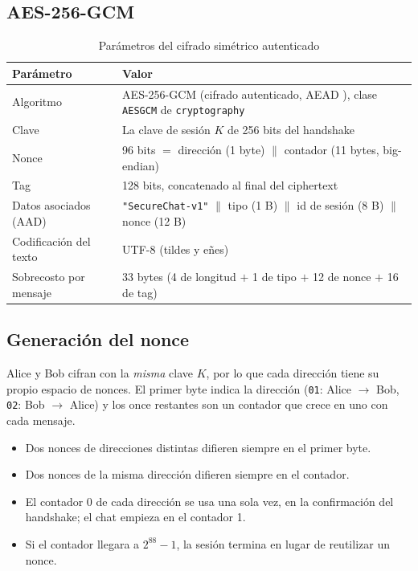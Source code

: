 \documentclass[11pt,a4paper]{article}
\theoremstyle{definition}
\theoremstyle{remark}
\newcommand{\code}[1]{\texttt{#1}}
\begin{document}
\subsection{AES-256-GCM}
\label{subsec:gcm}

\begin{table}[H]
  \centering
  \caption{Parámetros del cifrado simétrico autenticado}
  \label{tab:gcm}
  \small
  \begin{tabularx}{\linewidth}{@{}P{4.2cm} Y@{}}
    \toprule
    \textbf{Parámetro} & \textbf{Valor} \\
    \midrule
    Algoritmo           & AES-256-GCM (cifrado autenticado, AEAD \citep{rfc5116}), clase \code{AESGCM} de \code{cryptography} \\
    Clave               & La clave de sesión $K$ de 256 bits del handshake \\
    Nonce               & 96 bits $=$ dirección (1 byte) $\|$ contador (11 bytes, big-endian) \\
    Tag                 & 128 bits, concatenado al final del ciphertext \\
    Datos asociados (AAD) & \code{"SecureChat-v1"} $\|$ tipo (1 B) $\|$ id de sesión (8 B) $\|$ nonce (12 B) \\
    Codificación del texto & UTF-8 (tildes y eñes) \\
    Sobrecosto por mensaje & 33 bytes (4 de longitud $+$ 1 de tipo $+$ 12 de nonce $+$ 16 de tag) \\
    \bottomrule
  \end{tabularx}
\end{table}

\subsection{Generación del nonce}
\label{subsec:nonce}

Alice y Bob cifran con la \emph{misma} clave $K$, por lo que cada dirección
tiene su propio espacio de nonces. El primer byte indica la dirección
(\code{01}: Alice $\rightarrow$ Bob, \code{02}: Bob $\rightarrow$ Alice) y
los once restantes son un contador que crece en uno con cada mensaje.

\begin{itemize}
  \item Dos nonces de direcciones distintas difieren siempre en el primer byte.
  \item Dos nonces de la misma dirección difieren siempre en el contador.
  \item El contador 0 de cada dirección se usa una sola vez, en la
        confirmación del handshake; el chat empieza en el contador 1.
  \item Si el contador llegara a $2^{88}-1$, la sesión termina en lugar de
        reutilizar un nonce.
\end{itemize}
\end{document}
